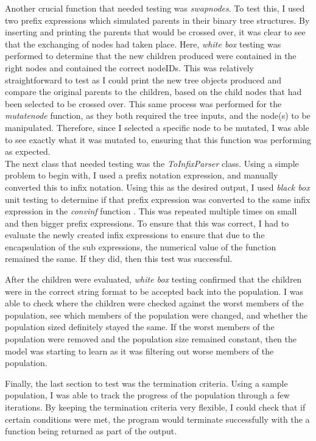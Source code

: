 \documentclass[11pt]{article}
\begin{document}
Another crucial function that needed testing was \textit{swap\textunderscore nodes}. To test this, I used two prefix expressions which simulated parents in their binary tree structures. By inserting and printing the parents that would be crossed over, it was clear to see that the exchanging of nodes had taken place. Here, \textit{white box} testing was performed to determine that the new children produced were contained in the right nodes and contained the correct nodeIDs. This was relatively straightforward to test as I could print the new tree objects produced and compare the original parents to the children, based on the child nodes that had been selected to be crossed over.  This same process was performed for the \textit{mutate\textunderscore node} function, as they both required the tree inputs, and the node(s) to be manipulated. Therefore, since I selected a specific node to be mutated, I was able to see exactly what it was mutated to, ensuring that this function was performing as expected.\\
The next class that needed testing was the \textit{ToInfixParser} class. Using a simple problem to begin with, I used a prefix notation expression, and manually converted this to infix notation. Using this as the desired output, I used \textit{black box} unit testing to determine if that prefix expression was converted to the same infix expression in the \textit{conv\textunderscore inf}  function . This was repeated multiple times on small and then bigger prefix expressions. To ensure that this was correct, I had to evaluate the newly created infix expressions to ensure that due to the encapsulation of the sub expressions, the numerical value of the function remained the same. If they did, then this test was successful. 

After the children were evaluated, \textit{white box} testing confirmed that the children were in the correct string format to be accepted back into the population. I was able to check where the children were checked against the worst members of the population, see which members of the population were changed, and whether the population sized definitely stayed the same. If the worst members of the population were removed and the population size remained constant, then the model was starting to learn as it was filtering out worse members of the population. 

Finally, the last section to test was the termination criteria. Using a sample population, I was able to track the progress of the population through a few iterations. By keeping the termination criteria very flexible, I could check that if certain conditions were met, the program would terminate successfully with the a function being returned as part of the output. 
\end{document}
